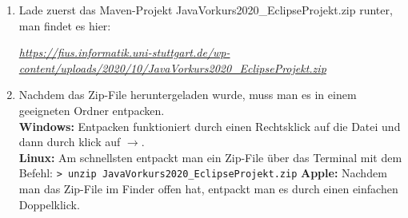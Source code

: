 
\newcommand{\jvkpackage}{JavaVorkurs2020_EclipseProjekt.zip}
\newcommand{\jvkpackageurl}{https://fius.informatik.uni-stuttgart.de/wp-content/uploads/2020/10/JavaVorkurs2020_EclipseProjekt.zip}



\begin{Infobox}
    \begin{enumerate}[label=\arabic*.]
        \item Lade zuerst das Maven-Projekt \jvkpackage { }runter, man findet es hier:
        \begin{center}
            \color{blue}\href{\jvkpackageurl}{\textit{\jvkpackageurl}}
        \end{center}

        \item Nachdem das Zip-File heruntergeladen wurde, muss man es in einem geeigneten Ordner entpacken.\\
        \textbf{Windows:} Entpacken funktioniert durch einen Rechtsklick auf die Datei und dann durch klick auf $\to$.\\
        \textbf{Linux:} Am schnellsten entpackt man ein Zip-File über das Terminal mit dem Befehl:
        \newline\hspace*{\fill}\texttt{\textgreater\ unzip \jvkpackage}\hspace*{\fill}\newline
        \textbf{Apple:} Nachdem man das Zip-File im Finder offen hat, entpackt man es durch einen einfachen Doppelklick.
    \end{enumerate}
\end{Infobox}



